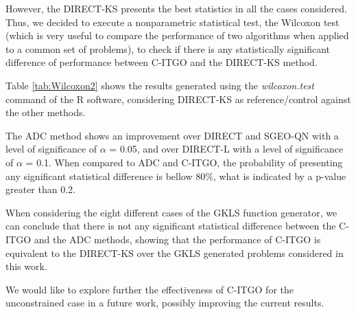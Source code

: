 However, the DIRECT-KS presents the best statistics in all the cases considered. Thus, we decided to execute a nonparametric statistical test, the Wilcoxon test \citep{Friedman} (which is very useful to compare the performance of two algorithms when applied to a common set of problems), to check if there is any statistically significant difference of performance between C-ITGO and the DIRECT-KS method.

Table \ref{tab:Wilcoxon2} shows the results generated using the \textit{wilcoxon.test} command of the R software, considering DIRECT-KS as reference/control against the other methods. 



The ADC method shows an improvement over DIRECT and SGEO-QN with a level of significance of $\alpha$ = 0.05, and over DIRECT-L with a level of significance of $\alpha$ = 0.1. When compared to ADC and C-ITGO, the probability of presenting any significant statistical difference is bellow 80\%, what is indicated by a p-value greater than 0.2. 

When considering the eight different cases of the GKLS function generator, we can conclude that there is not any significant statistical difference between the C-ITGO and the ADC methods, showing that the performance of C-ITGO is equivalent to the DIRECT-KS over the GKLS generated problems considered in this work.

We would like to explore further the effectiveness of C-ITGO for the unconstrained case in a future work, possibly improving the current results.